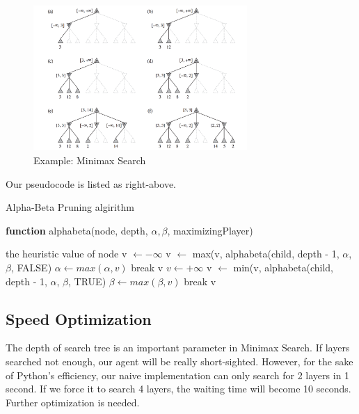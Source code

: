 \documentclass[12pt,a4paper]{article}
\begin{document}
\begin{figure}[!h]
\centering\includegraphics[width=3.2in]{4.png}
\caption{Example: Minimax Search}
\end{figure}

Our pseudocode is listed as right-above.
\begin{small}
\begin{algorithm}[!h]
\caption{Alpha-Beta Pruning algirithm}
\hspace*{0.02in} {\bf function}
alphabeta(node, depth, $\alpha, \beta$, maximizingPlayer)
\begin{algorithmic}
	\State \Return the heuristic value of node
		\State v $\gets - \infty$
			\State v $\gets$ max(v, alphabeta(child, depth - 1, $\alpha$, $\beta$, FALSE)
			\State $\alpha \gets max(\alpha, v)$
			\If{$\beta \leq \alpha$}
				\State break
			\EndIf
		\State \Return v
		\EndFor
	\Else
		\State $v \gets + \infty$
			\State v $\gets$ min(v, alphabeta(child, depth - 1, $\alpha$, $\beta$, TRUE)
			\State $\beta \gets max(\beta, v)$
			\If{$\beta \leq \alpha$}
				\State break
			\EndIf
		\State \Return v
		\EndFor
	\EndIf
\EndIf
\end{algorithmic}
\end{algorithm}
\end{small}

\subsection{Speed Optimization}
The depth of search tree is an important parameter in Minimax Search. If layers searched not enough, our agent will be really short-sighted. However, for the sake of Python's efficiency, our naive implementation can only search for 2 layers in 1 second. If we force it to search 4 layers, the waiting time will become 10 seconds. Further optimization is needed.
\end{document}
